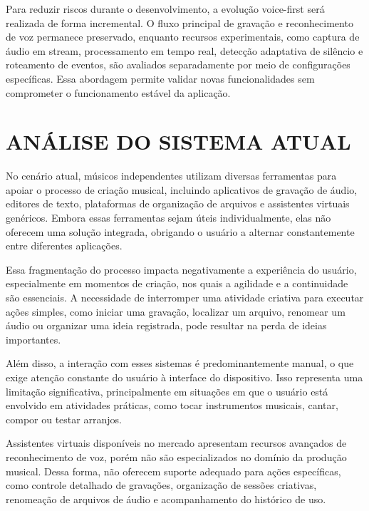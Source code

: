 \documentclass[12pt,oneside,a4paper,brazil,final]{abntex2}
\begin{document}
Para reduzir riscos durante o desenvolvimento, a evolução voice-first será realizada de forma incremental. O fluxo principal de gravação e reconhecimento de voz permanece preservado, enquanto recursos experimentais, como captura de áudio em stream, processamento em tempo real, detecção adaptativa de silêncio e roteamento de eventos, são avaliados separadamente por meio de configurações específicas. Essa abordagem permite validar novas funcionalidades sem comprometer o funcionamento estável da aplicação.






\chapter{ANÁLISE DO SISTEMA ATUAL}



No cenário atual, músicos independentes utilizam diversas ferramentas para apoiar o processo de criação musical, incluindo aplicativos de gravação de áudio, editores de texto, plataformas de organização de arquivos e assistentes virtuais genéricos. Embora essas ferramentas sejam úteis individualmente, elas não oferecem uma solução integrada, obrigando o usuário a alternar constantemente entre diferentes aplicações.



Essa fragmentação do processo impacta negativamente a experiência do usuário, especialmente em momentos de criação, nos quais a agilidade e a continuidade são essenciais. A necessidade de interromper uma atividade criativa para executar ações simples, como iniciar uma gravação, localizar um arquivo, renomear um áudio ou organizar uma ideia registrada, pode resultar na perda de ideias importantes.



Além disso, a interação com esses sistemas é predominantemente manual, o que exige atenção constante do usuário à interface do dispositivo. Isso representa uma limitação significativa, principalmente em situações em que o usuário está envolvido em atividades práticas, como tocar instrumentos musicais, cantar, compor ou testar arranjos.



Assistentes virtuais disponíveis no mercado apresentam recursos avançados de reconhecimento de voz, porém não são especializados no domínio da produção musical. Dessa forma, não oferecem suporte adequado para ações específicas, como controle detalhado de gravações, organização de sessões criativas, renomeação de arquivos de áudio e acompanhamento do histórico de uso.
\end{document}
